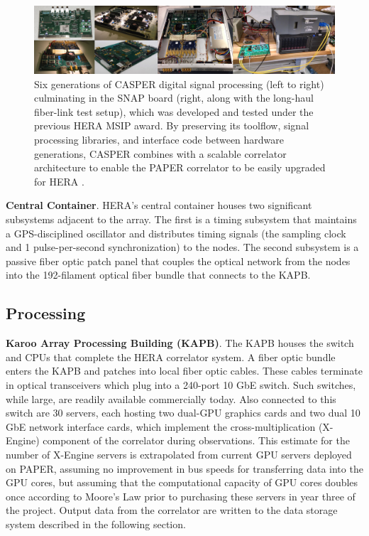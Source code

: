 \documentclass[preprint,11pt]{aastex}
\newcommand{\Mycitep}[1]{\citep{#1}}
\begin{document}
\begin{figure}[h]
\centering
\includegraphics[width=1.0\textwidth]{plots/casper_boards.png}
\caption{
Six generations of CASPER digital signal processing (left to right) culminating in the SNAP board (right, along with the long-haul fiber-link test setup), which was developed and tested under the previous HERA MSIP award.
By preserving its toolflow, signal processing libraries, and interface code between hardware generations,
CASPER combines with a scalable correlator architecture to enable the PAPER correlator to be 
easily upgraded for HERA \Mycitep{parsons_et_al2006,parsons_et_al2008}.
%
}\label{fig:hardware}
\end{figure}

{\bf Central Container}.
HERA's central container houses two significant subsystems adjacent to the array.  The first is a timing subsystem
that maintains a GPS-disciplined oscillator and distributes timing
signals (the sampling clock and 1 pulse-per-second synchronization) to the nodes.  The second
subsystem is a passive fiber optic patch panel that couples
the optical network from the nodes into the 192-filament optical fiber bundle 
that connects to the KAPB. 

\subsection{Processing}
\label{sec:processing}
{\bf Karoo Array Processing Building (KAPB)}.
The KAPB houses the switch and CPUs
that 
complete the HERA correlator system.  A fiber optic bundle enters the KAPB and patches
into local fiber optic cables. These cables terminate in optical transceivers which plug into a 240-port 10 GbE switch.
Such switches, while large, are readily available commercially today.  Also connected to
this switch are 30 servers, each hosting two dual-GPU graphics cards and two dual
10 GbE network interface cards, which implement the cross-multiplication (X-Engine) component
of the correlator during observations.  This estimate for the number of X-Engine servers
is extrapolated from current GPU servers deployed on PAPER, assuming no improvement in bus
speeds for transferring data into the GPU cores, but assuming that the computational
capacity of GPU cores doubles once according to Moore's Law prior to purchasing
these servers in year three of the project.
Output data from the correlator are written to the data storage system described
in the following section.
\end{document}
